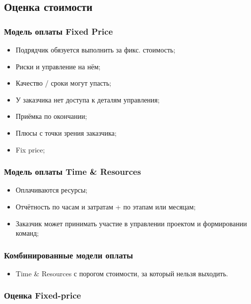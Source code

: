\documentclass[a4paper,8pt]{article}
\begin{document}
\subsection{Оценка стоимости}



\subsubsection{Модель оплаты Fixed Price}

    \begin{itemize}
        \item Подрядчик обязуется выполнить за фикс. стоимость;
        \item Риски и управление на нём;
        \item Качество / сроки могут упасть;
        \item У заказчика нет доступа к деталям управления;
        \item Приёмка по окончании;
        \item Плюсы с точки зрения заказчика;
        \item Fix price;
    \end{itemize}


\subsubsection{Модель оплаты Time \& Resources}


    \begin{itemize}
        \item Оплачиваются ресурсы;
        \item Отчётность по часам и затратам + по этапам или месяцам;
        \item Заказчик может принимать участие в управлении проектом и формировании команд;
    \end{itemize}


\subsubsection{Комбинированные модели оплаты}

    \begin{itemize}
        \item Time \& Resources с порогом стоимости, за который нельзя выходить.
    \end{itemize}


\subsubsection{Оценка Fixed-price}
\end{document}
